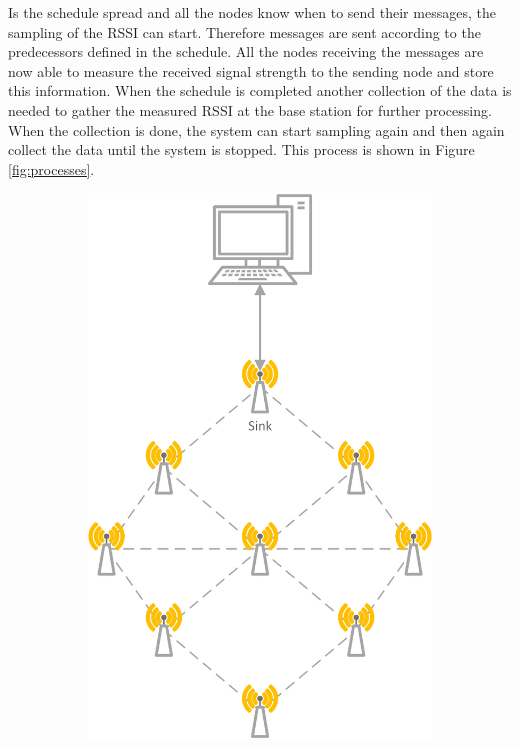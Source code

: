 Is the schedule spread and all the nodes know when to send their messages, the sampling of the RSSI can start. Therefore messages are sent according to the predecessors defined in the schedule. All the nodes receiving the messages are now able to measure the received signal strength to the sending node and store this information. When the schedule is completed another collection of the data is needed to gather the measured RSSI at the base station for further processing. When the collection is done, the system can start sampling again and then again collect the data until the system is stopped. This process is shown in Figure \ref{fig:processes}.    

\begin{figure}[htbp]
	\centering
	\begin{subfigure}[t]{0.4\textwidth}
		\centering
    		\includegraphics[scale=0.6]{content/images/Architecture}

\end{subfigure}
\end{figure}
